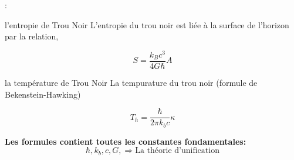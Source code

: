 \begin{frame}{\underline{\secname} : {\small \subsecname}}

\begin{block}{l’entropie de Trou Noir}
L'entropie du trou noir est liée à la surface de l'horizon par la relation,

$$S=\frac{k_{B} c^{3}}{4 G \hbar} A$$
\end{block}

\begin{block}{la température de Trou Noir}
La tempurature du trou noir (formule de Bekenstein-Hawking)

$$T_{h}=\frac{\hbar}{2 \pi k_{b} c} \kappa$$
\end{block}

\pause
\textbf{Les formules contient toutes les constantes fondamentales:}\\


	$$ \hbar, k_b, c, G,\Rightarrow \text{La théorie d’unification}$$
\end{frame}

%
%
%
%
%


